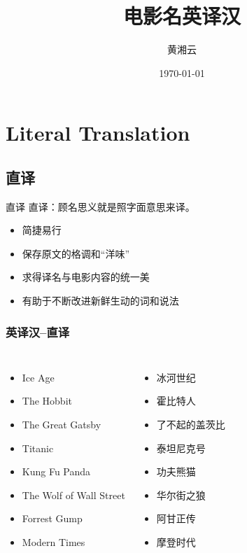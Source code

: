 \documentclass[xcolor=x11names,compress]{ctexbeamer}
\title{电影名英译汉}
\author{黄湘云}
\institute
{
  理学院\\
  中国矿业大学（北京）
}
\date{\today}
\begin{document}
\maketitle


\section[Literal Translation]{Literal Translation}
\subsection{直译}

\begin{frame}{直译}
直译：顾名思义就是照字面意思来译。
\begin{itemize}
\item 简捷易行
\item 保存原文的格调和“洋味”
\item 求得译名与电影内容的统一美
\item 有助于不断改进新鲜生动的词和说法
\end{itemize}

\end{frame}

\begin{frame}
\frametitle{英译汉--直译}
\begin{columns}

\begin{itemize}
\item Ice Age
\item The Hobbit
\item The Great Gatsby
\item Titanic
\item Kung Fu Panda
\item The Wolf of Wall Street
\item Forrest Gump
\item Modern Times
\end{itemize}
\pause
{}
\begin{itemize}
\item 冰河世纪
\item 霍比特人
\item 了不起的盖茨比
\item 泰坦尼克号
\item 功夫熊猫
\item 华尔街之狼
\item 阿甘正传
\item 摩登时代
\end{itemize}
\end{columns}
\end{frame}
\end{document}
